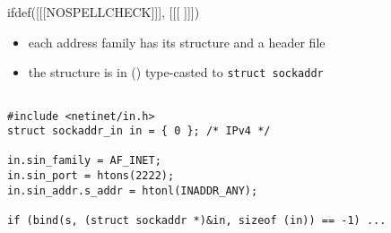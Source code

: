 
ifdef([[[NOSPELLCHECK]]], [[[
]]])

\begin{slide}

\begin{itemize}
\item each address family has its structure and a header file
\item the structure is in () type-casted to \texttt{struct sockaddr}
\end{itemize}

\begin{verbatim}

#include <netinet/in.h>
struct sockaddr_in in = { 0 }; /* IPv4 */

in.sin_family = AF_INET;
in.sin_port = htons(2222);
in.sin_addr.s_addr = htonl(INADDR_ANY);

if (bind(s, (struct sockaddr *)&in, sizeof (in)) == -1) ...
\end{verbatim}
\end{slide}



